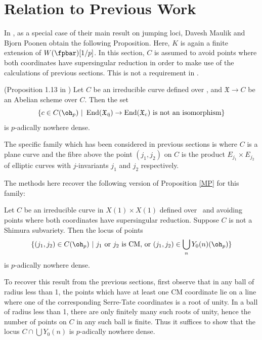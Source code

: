 \documentclass[12pt,letterpaper]{article}
\DeclareMathOperator{\End}{End}
\begin{document}
	
	
	
	
	
	
	
		
	\section{Relation to Previous Work} \label{Relate}
	
	In \cite{MP09}, as a special case of their main result on jumping loci, Davesh Maulik and Bjorn Poonen obtain the following Proposition. Here, $K$ is again a finite extension of $W(\fpbar)[1/p]$. In this section, $C$ is assumed to avoid points where both coordinates have supersingular reduction in order to make use of the calculations of previous sections. This is not a requirement in \cite{MP09}.
	
	\begin{prop}\label{MP} (Proposition 1.13 in \cite{MP09})
		Let $C$ be an irreducible curve defined over \ok, and $\mathfrak{X}\to C$ be an Abelian scheme over $C$. Then the set		
		\[\{c\in C(\oh_p) \ | \ \End(\mathfrak{X}_{\bar{\eta}})\to \End(\mathfrak{X}_c) \text{ is not an isomorphism}\}\] is $p$-adically nowhere dense.
	\end{prop}
	
	The specific family which has been considered in previous sections is where $C$ is a plane curve and the fibre above the point $(j_1,j_2)$ on $C$ is the product $E_{j_1}\times E_{j_2}$ of elliptic curves with $j$-invariants $j_1$ and $j_2$ respectively.
	
	The methods here recover the following version of Proposition \ref{MP} for this family:
	
	\begin{prop}
		Let $C$ be an irreducible curve in $X(1)\times X(1)$ defined over \ok \ and avoiding points where both coordinates have supersingular reduction. Suppose $C$ is not a Shimura subvariety. Then the locus of points 
		\[\{(j_1,j_2)\in C(\oh_p) \ | \ j_1 \text{ or } j_2 \text{ is CM, or } (j_1,j_2)\in \bigcup_nY_0(n)(\oh_p) \}\] is $p$-adically nowhere dense.
	\end{prop}
	
	To recover this result from the previous sections, first observe that in any ball of radius less than 1, the points which have at least one CM coordinate lie on a line where one of the corresponding Serre-Tate coordinates is a root of unity. In a ball of radius less than 1, there are only finitely many such roots of unity, hence the number of points on $C$ in any such ball is finite. Thus it suffices to show that the locus $C\cap\bigcup Y_0(n)$ is $p$-adically nowhere dense. 
	
\end{document}
